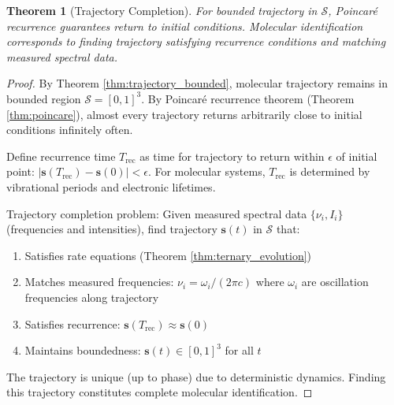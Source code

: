 \documentclass[twocolumn,10pt]{article}
\newtheorem{theorem}{Theorem}[section]
\newcommand{\Sspace}{\mathcal{S}}
\begin{document}
\begin{theorem}[Trajectory Completion]
\label{thm:trajectory_completion}
For bounded trajectory in $\Sspace$, Poincar\'e recurrence guarantees return to initial conditions. Molecular identification corresponds to finding trajectory satisfying recurrence conditions and matching measured spectral data.
\end{theorem}

\begin{proof}
By Theorem \ref{thm:trajectory_bounded}, molecular trajectory remains in bounded region $\Sspace = [0,1]^3$. By Poincar\'e recurrence theorem (Theorem \ref{thm:poincare}), almost every trajectory returns arbitrarily close to initial conditions infinitely often.

Define recurrence time $T_{\text{rec}}$ as time for trajectory to return within $\epsilon$ of initial point: $|\mathbf{s}(T_{\text{rec}}) - \mathbf{s}(0)| < \epsilon$. For molecular systems, $T_{\text{rec}}$ is determined by vibrational periods and electronic lifetimes.

Trajectory completion problem: Given measured spectral data $\{\nu_i, I_i\}$ (frequencies and intensities), find trajectory $\mathbf{s}(t)$ in $\Sspace$ that:
\begin{enumerate}
\item Satisfies rate equations (Theorem \ref{thm:ternary_evolution})
\item Matches measured frequencies: $\nu_i = \omega_i/(2\pi c)$ where $\omega_i$ are oscillation frequencies along trajectory
\item Satisfies recurrence: $\mathbf{s}(T_{\text{rec}}) \approx \mathbf{s}(0)$
\item Maintains boundedness: $\mathbf{s}(t) \in [0,1]^3$ for all $t$
\end{enumerate}

The trajectory is unique (up to phase) due to deterministic dynamics. Finding this trajectory constitutes complete molecular identification.
\end{proof}
\end{document}
